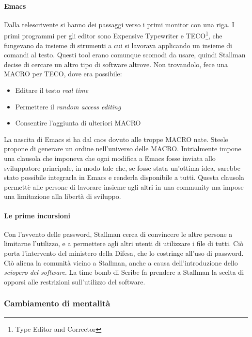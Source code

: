 \paragraph*{Emacs} Dalla telescrivente si hanno dei passaggi verso i primi monitor con una riga. I primi programmi per gli editor sono Expensive Typewriter e TECO\footnote{Type Editor and Corrector}, che fungevano da insieme di strumenti a cui si lavorava applicando un insieme di comandi al testo. Questi tool erano comunque scomodi da usare, quindi Stallman decise di cercare un altro tipo di software altrove. Non trovandolo, fece una MACRO per TECO, dove era possibile:
\begin{itemize}
  
\item Editare il testo \textit{real time}
\item Permettere il \textit{random access editing}
\item Consentire l'aggiunta di ulteriori MACRO

\end{itemize}

La nascita di Emacs si ha dal caos dovuto alle troppe MACRO nate. Steele propone di generare un ordine nell'universo delle MACRO. Inizialmente impone una clausola che imponeva che ogni modifica a Emacs fosse inviata allo sviluppatore principale, in modo tale che, se fosse stata un'ottima idea, sarebbe stato possibile integrarla in Emacs e renderla disponibile a tutti. Questa clausola permett\`e alle persone di lavorare insieme agli altri in una community ma impose una limitazione alla libert\`a di sviluppo.

\paragraph*{Le prime incursioni} Con l'avvento delle password, Stallman cerca di convincere le altre persone a limitarne l'utilizzo, e a permettere agli altri utenti di utilizzare i file di tutti. Ci\`o porta l'intervento del ministero della Difesa, che lo costringe all'uso di password. Ci\`o aliena la comunit\`a vicino a Stallman, anche a causa dell'introduzione dello \textit{sciopero del software}. La time bomb di Scribe fa prendere a Stallman la scelta di opporsi alle restrizioni sull'utilizzo del software.

\subsubsection{Cambiamento di mentalit\`a}


